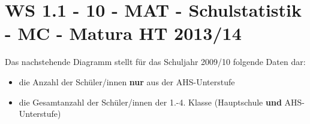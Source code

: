 \section{WS 1.1 - 10 - MAT - Schulstatistik - MC - Matura HT 2013/14}

\begin{beispiel}[WS 1.1]{1} %
			Das nachstehende Diagramm stellt für das Schuljahr 2009/10 folgende Daten dar:
			\begin{itemize}
				\item die Anzahl der Schüler/innen \textbf{nur} aus der AHS-Unterstufe
				\item die Gesamtanzahl der Schüler/innen der 1.-4. Klasse (Hauptschule \textbf{und} AHS-Unterstufe)
			\end{itemize}\leer
			

\end{beispiel}
